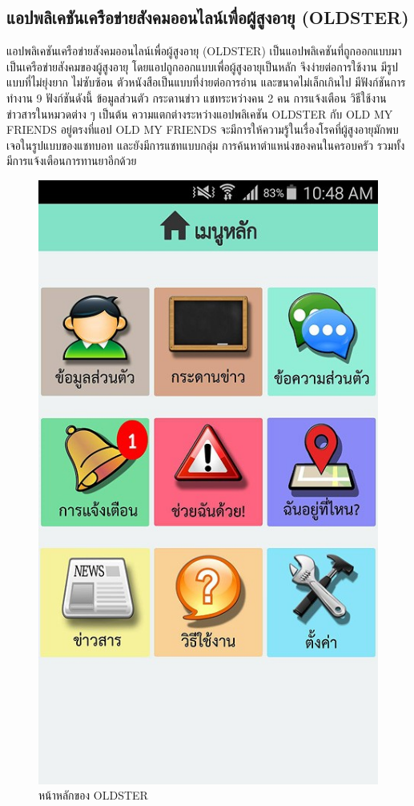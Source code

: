\begin{enumerate}
		 \subsection{แอปพลิเคชันเครือข่ายสังคมออนไลน์เพื่อผู้สูงอายุ (OLDSTER) }
		 แอปพลิเคชันเครือข่ายสังคมออนไลน์เพื่อผู้สูงอายุ (OLDSTER) \cite{PSU} เป็นแอปพลิเคชันที่ถูกออกแบบมาเป็นเครือข่ายสังคมของผู้สูงอายุ โดยแอปถูกออกแบบเพื่อผู้สูงอายุเป็นหลัก จึงง่ายต่อการใช้งาน มีรูปแบบที่ไม่ยุ่งยาก ไม่ซับซ้อน ตัวหนังสือเป็นแบบที่ง่ายต่อการอ่าน และขนาดไม่เล็กเกินไป 
		 มีฟังก์ชันการทำงาน 9 ฟังก์ชันดังนี้ ข้อมูลส่วนตัว กระดานข่าว แชทระหว่างคน 2 คน การแจ้งเตือน วิธีใช้งาน ข่าวสารในหมวดต่าง ๆ เป็นต้น ความแตกต่างระหว่างแอปพลิเคชัน OLDSTER กับ OLD MY FRIENDS อยู่ตรงที่แอป OLD MY FRIENDS
		 จะมีการให้ความรู้ในเรื่องโรคที่ผู้สูงอายุมักพบเจอในรูปแบบของแชทบอท และยังมีการแชทแบบกลุ่ม การค้นหาตำแหน่งของคนในครอบครัว รวมทั้งมีการแจ้งเตือนการทานยาอีกด้วย
			 \begin{figure}[H]
			 	\centering
			 	\includegraphics[width=0.7\columnwidth]{Figures/2/ref1}
			 	\caption{หน้าหลักของ OLDSTER}
			 	\label{Fig:Studentloan1}
			 \end{figure}
			 

\end{enumerate}

